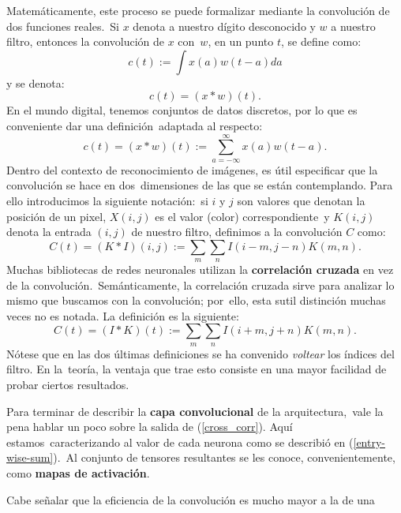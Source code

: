 \noindent
Matemáticamente, este proceso se puede formalizar mediante la convolución de dos funciones reales.\
Si $x$ denota a nuestro dígito desconocido y $w$ a nuestro filtro, entonces la convolución de $x$ con\
$w$, en un punto $t$, se define como:
\begin{equation}
  c(t) := \int x(a) w(t-a) da
\end{equation}
y se denota:
\begin{equation}
  c(t) = (x * w)(t).
\end{equation}
En el mundo digital, tenemos conjuntos de datos discretos, por lo que es conveniente dar una definición\
adaptada al respecto:
\begin{equation}
  c(t) = (x * w)(t) := \sum _{a=-\infty} ^{\infty} x(a) w(t-a).
\end{equation}
Dentro del contexto de reconocimiento de imágenes, es útil especificar que la convolución se hace en dos\
dimensiones de las que se están contemplando. Para ello introducimos la siguiente notación:\
si $i$ y $j$ son valores que denotan la posición de un pixel, $X(i,j)$ es el valor (color) correspondiente\
y $K(i,j)$ denota la entrada $(i,j)$ de nuestro filtro, definimos a la convolución $C$ como:
\begin{equation}
  C(t) = (K * I)(i,j) := \sum_m \sum_n I(i-m,j-n) K(m,n).
\end{equation}
Muchas bibliotecas de redes neuronales utilizan la \textbf{correlación cruzada} en vez de la convolución.\
Semánticamente, la correlación cruzada sirve para analizar lo mismo que buscamos con la convolución; por\
ello, esta sutil distinción muchas veces no es notada. La definición es la siguiente:
\begin{equation} \label{cross_corr}
  C(t) = (I * K)(t) := \sum_m \sum_n I(i+m,j+n) K(m,n).
\end{equation}
Nótese que en las dos últimas definiciones se ha convenido \emph{voltear} los índices del filtro. En la\
teoría, la ventaja que trae esto consiste en una mayor facilidad de probar ciertos resultados.\par
Para terminar de describir la \textbf{capa convolucional} de la arquitectura,\
vale la pena hablar un poco sobre la salida de (\ref{cross_corr}). Aquí estamos\
caracterizando al valor de cada neurona como se describió en (\ref{entry-wise-sum}).\
Al conjunto de tensores resultantes se les conoce, convenientemente, como \textbf{mapas de activación}.\par
Cabe señalar que la eficiencia de la convolución es mucho mayor a la de una\
